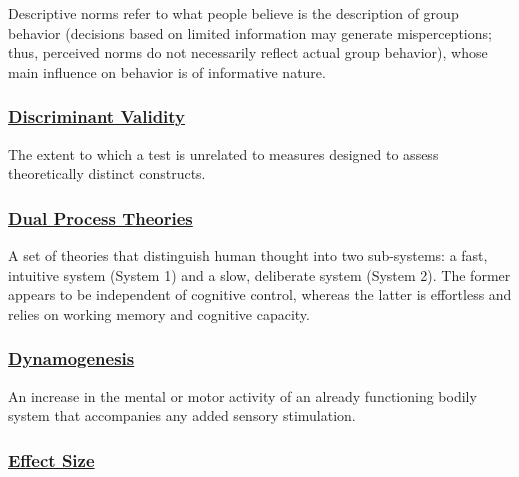 \documentclass[
  letterpaper,
]{book}
\begin{document}
Descriptive norms refer to what people believe is the description of
group behavior (decisions based on limited information may generate
misperceptions; thus, perceived norms do not necessarily reflect actual
group behavior), whose main influence on behavior is of informative
nature.

\subsubsection*{\texorpdfstring{\hyperref[def-discriminantvalidity]{Discriminant
Validity}}{Discriminant Validity}}\label{discriminant-validity}

The extent to which a test is unrelated to measures designed to assess
theoretically distinct constructs.

\subsubsection*{\texorpdfstring{\hyperref[def-dualprocess]{Dual Process
Theories}}{Dual Process Theories}}\label{dual-process-theories}

A set of theories that distinguish human thought into two sub-systems: a
fast, intuitive system (System 1) and a slow, deliberate system (System
2). The former appears to be independent of cognitive control, whereas
the latter is effortless and relies on working memory and cognitive
capacity.

\subsubsection*{\texorpdfstring{\hyperref[def-dynamogenesis]{Dynamogenesis}}{Dynamogenesis}}\label{dynamogenesis}

An increase in the mental or motor activity of an already functioning
bodily system that accompanies any added sensory stimulation.

\subsubsection*{\texorpdfstring{\hyperref[def-effectsize]{Effect
Size}}{Effect Size}}\label{effect-size}
\end{document}
